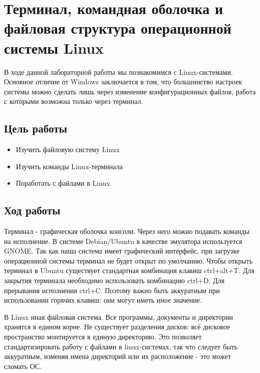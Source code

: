 \section{Терминал, командная оболочка и файловая структура операционной системы Linux}

В ходе данной лабораторной работы мы познакомимся с Linux-системами. Основное отличие от Windows заключается в том, что большинство настроек системы можно сделать лишь через изменение конфигурационных файлов, работа с которыми возможна только через терминал.

\subsection{Цель работы}
\begin{itemize}
    \item Изучить файловую систему Linux
    \item Изучить команды Linux-терминала
    \item Поработать с файлами в Linux
\end{itemize}
\subsection{Ход работы}

Терминал - графическая оболочка консоли. Через него можно подавать команды на исполнение. В системе Debian/Ubuntu в качестве эмулятора используется GNOME. Так как наша система имеет графический интерфейс, при загрузке операционной системы терминал не будет открыт по умолчанию. Чтобы открыть терминал в Ubuntu существует стандартная комбинация клавиш ctrl+alt+T. Для закрытия терминала необходимо использовать комбинацию ctrl+D. Для прерывания исполнения ctrl+C. Поэтому важно быть аккуратным при использовании горячих клавиш: они могут иметь иное значение. 

В Linux иная файловая система. Все программы, документы и директории хранятся в едином корне. Не существует разделения дисков: всё дисковое пространство монтируется в единую директорию. Это позволяет стандартизировать работу с файлами в linux-системах, так что следует быть аккуратным, изменяя имена директорий или их расположение - это может сломать ОС. 

